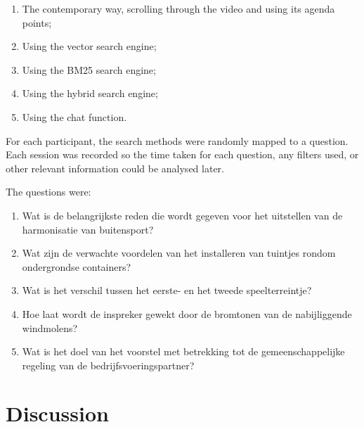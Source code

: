 \documentclass[twoside]{uva-inf-bachelor-thesis}
\begin{document}
\begin{enumerate}
    \item The contemporary way, scrolling through the video and using its agenda points;
    \item Using the vector search engine;
    \item Using the BM25 search engine;
    \item Using the hybrid search engine;
    \item Using the chat function.
\end{enumerate}

For each participant, the search methods were randomly mapped to a question. 
Each session was recorded so the time taken for each question, any filters used, or other relevant information could be analysed later.

The questions were:
\begin{enumerate}
    \item Wat is de belangrijkste reden die wordt gegeven voor het uitstellen van de harmonisatie van buitensport?
    \item Wat zijn de verwachte voordelen van het installeren van tuintjes rondom ondergrondse containers?
    \item Wat is het verschil tussen het eerste- en het tweede speelterreintje?
    \item Hoe laat wordt de inspreker gewekt door de bromtonen van de nabijliggende windmolens?
    \item Wat is het doel van het voorstel met betrekking tot de gemeenschappelijke regeling van de bedrijfsvoeringspartner?
\end{enumerate}

\chapter{Discussion}



\printbibliography
\end{document}
